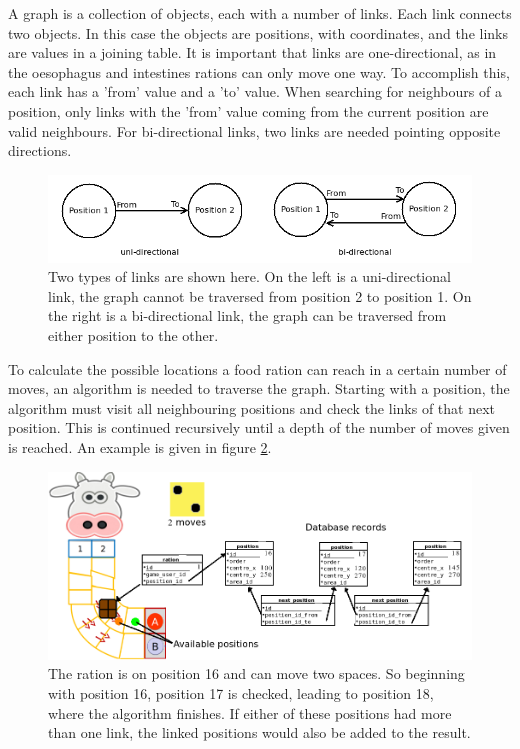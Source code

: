 A graph is a collection of objects, each with a number of links. Each link connects two objects. In this case the objects are positions, with coordinates, and the links are values in a joining table. It is important that links are one-directional, as in the oesophagus and intestines rations can only move one way. To accomplish this, each link has a 'from' value and a 'to' value. When searching for neighbours of a position, only links with the 'from' value coming from the current position are valid neighbours. For bi-directional links, two links are needed pointing opposite directions.

\begin{figure}[ht]
\centering
\includegraphics[width=5in]{Images/2/detail-links}
\caption{Two types of links are shown here. On the left is a uni-directional link, the graph cannot be traversed from position 2 to position 1. On the right is a bi-directional link, the graph can be traversed from either position to the other.}
\label{2_detail_links}
\end{figure}

To calculate the possible locations a food ration can reach in a certain number of moves, an algorithm is needed to traverse the graph. Starting with a position, the algorithm must visit all neighbouring positions and check the links of that next position. This is continued recursively until a depth of the number of moves given is reached. An example is given in figure \ref{2_detail_search}. 

\begin{figure}[ht]
\centering
\includegraphics[width=6in]{Images/2/detail-2}
\caption{The ration is on position 16 and can move two spaces. So beginning with position 16, position 17 is checked, leading to position 18, where the algorithm finishes. If either of these positions had more than one link, the linked positions would also be added to the result.}
\label{2_detail_search}
\end{figure}

